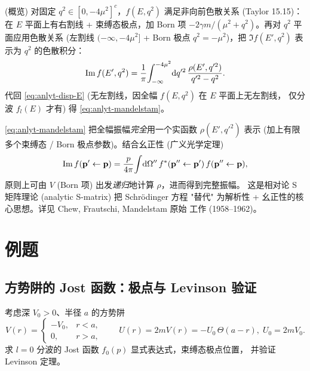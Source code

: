 \begin{proof*}\!(概览)
对固定 $q^2\in[0,-4\mu^2]^c$，$f(E,q^2)$ 满足非向前色散关系
(Taylor 15.15)：在 $E$ 平面上有右割线 + 束缚态极点，加 Born 项
$-2\gamma m/(\mu^2+q^2)$。再对 $q^2$ 平面应用色散关系 (左割线
$(-\infty,-4\mu^2]$ + Born 极点 $q^2=-\mu^2$)，把 $\Im f(E',q^2)$ 表示为
$q^2$ 的色散积分：
\begin{equation}
\Im f(E',q^2)=\frac{1}{\pi}\!\int_{-\infty}^{-4\mu^2}\!\mathrm{d} q'^2\,
\frac{\rho(E',q'^2)}{q'^2-q^2}.
\label{eq:anlyt-Imf-disp}
\end{equation}
代回 \eqref{eq:anlyt-disp-E} (无左割线，因全幅 $f(E,q^2)$ 在 $E$ 平面上无左割线，
仅分波 $f_l(E)$ 才有) 得 \eqref{eq:anlyt-mandelstam}。
\end{proof*}

\begin{remark}
\eqref{eq:anlyt-mandelstam} 把全幅振幅\emph{完全}用一个实函数 $\rho(E',q'^2)$
表示 (加上有限多个束缚态 / Born 极点参数)。结合幺正性 (广义光学定理)
\begin{equation}
\Im f(\mathbf p'\leftarrow\mathbf p)=\frac{p}{4\pi}\!\int\!\mathrm{d}\Omega''\,
f^*(\mathbf p''\leftarrow\mathbf p')\,f(\mathbf p''\leftarrow\mathbf p),
\label{eq:anlyt-gen-optical}
\end{equation}
原则上可由 $V$ (Born 项) 出发\emph{递归}地计算 $\rho$，进而得到完整振幅。
这是相对论 S 矩阵理论 (analytic S-matrix) 把 Schr\"odinger 方程
"替代" 为解析性 + 幺正性的核心思想。详见 Chew, Frautschi, Mandelstam 原始
工作 (1958--1962)。
\end{remark}

\section{例题}\label{sec:anlyt-examples}

\subsection{方势阱的 Jost 函数：极点与 Levinson 验证}\label{ssec:anlyt-ex-square}

\begin{example}\label{ex:anlyt-square-well}
考虑深 $V_0>0$、半径 $a$ 的方势阱
\begin{equation}
V(r)=\begin{cases}-V_0,& r<a,\\ 0,& r>a,\end{cases}
\qquad U(r)=2mV(r)=-U_0\,\Theta(a-r),\;U_0=2mV_0.
\label{eq:anlyt-sqwell-V}
\end{equation}
求 $l=0$ 分波的 Jost 函数 $f_0(p)$ 显式表达式，束缚态极点位置，
并验证 Levinson 定理。
\end{example}

